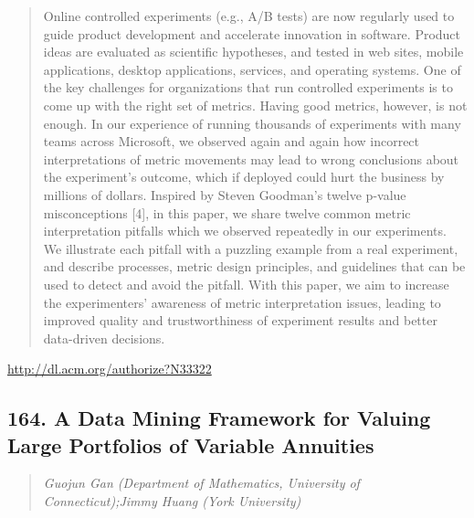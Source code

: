 \documentclass{article}
\begin{document}
\begin{quote}
Online controlled experiments (e.g., A/B tests) are now regularly used to guide product development and accelerate innovation in software. Product ideas are evaluated as scientific hypotheses, and tested in web sites, mobile applications, desktop applications, services, and operating systems. One of the key challenges for organizations that run controlled experiments is to come up with the right set of metrics. Having good metrics, however, is not enough. In our experience of running thousands of experiments with many teams across Microsoft, we observed again and again how incorrect interpretations of metric movements may lead to wrong conclusions about the experiment’s outcome, which if deployed could hurt the business by millions of dollars. Inspired by Steven Goodman’s twelve p-value misconceptions [4], in this paper, we share twelve common metric interpretation pitfalls which we observed repeatedly in our experiments. We illustrate each pitfall with a puzzling example from a real experiment, and describe processes, metric design principles, and guidelines that can be used to detect and avoid the pitfall. With this paper, we aim to increase the experimenters’ awareness of metric interpretation issues, leading to improved quality and trustworthiness of experiment results and better data-driven decisions.
\end{quote}

\href{http://dl.acm.org/authorize?N33322}{http://dl.acm.org/authorize?N33322}

\subsection{164. A Data Mining Framework for Valuing Large Portfolios of Variable Annuities}

\begin{quote}
\footnotesize{\textit{Guojun Gan (Department of Mathematics, University of Connecticut);Jimmy Huang (York University)}}

\end{quote}
\end{document}

